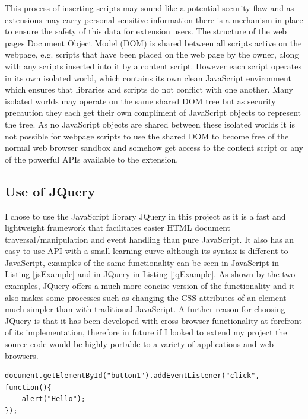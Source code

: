 \documentclass[12pt]{article}
\begin{document}
This process of inserting scripts may sound like a potential security flaw and as extensions may carry personal sensitive information there is a mechanism in place to ensure the safety of this data for extension users. The structure of the web pages Document Object Model (DOM) is shared between all scripts active on the webpage, e.g. scripts that have been placed on the web page by the owner, along with any scripts inserted into it by a content script. However each script operates in its own isolated world, which contains its own clean JavaScript environment which ensures that libraries and scripts do not conflict with one another. Many isolated worlds may operate on the same shared DOM tree but as security precaution they each get their own compliment of JavaScript objects to represent the tree. As no JavaScript objects are shared between these isolated worlds it is not possible for webpage scripts to use the shared DOM to become free of the normal web browser sandbox and somehow get access to the content script or any of the powerful APIs available to the extension. 

\subsection{Use of JQuery}
I chose to use the JavaScript library JQuery in this project as it is a fast and lightweight framework that facilitates easier HTML document traversal/manipulation and event handling than pure JavaScript. It also has an easy-to-use API with a small learning curve although its syntax is different to JavaScript, examples of the same functionality can be seen in JavaScript in Listing \ref{jsExample} and in JQuery in Listing \ref{jqExample}. As shown by the two examples, JQuery offers a much more concise version of the functionality and it also makes some processes such as changing the CSS attributes of an element much simpler than with traditional JavaScript. A further reason for choosing  JQuery is that it has been developed with cross-browser functionality at forefront of its  implementation, therefore in future if I looked to extend my project the source code would be highly portable to a variety of applications and web browsers. 

\begin{lstlisting}[caption=Setting the onClick functionality of button in JavaScript, label={jsExample}]
document.getElementById("button1").addEventListener("click", function(){ 
    alert("Hello");
});
\end{lstlisting}
\end{document}
